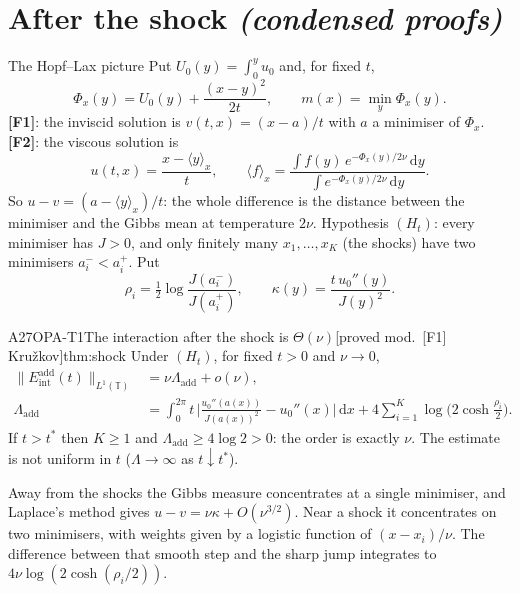 \documentclass[11pt,a4paper,oneside]{report}
\newcommand{\badge}[2]{\textcolor{#1}{\textsf{\footnotesize[#2]}}}
\newcommand{\modulo}[1]{\badge{cD}{proved mod.\ #1}}
\newcommand{\Eint}{E_{\mathrm{int}}}
\newcommand{\dd}{\,\mathrm{d}}
\newenvironment{dimcard}[5]{\par\Needspace{12\baselineskip}\begin{dimcardbox}{#1}{#2}{#3}{#4}{#5}}{\end{dimcardbox}}
\begin{document}
\section{After the shock \emph{(condensed proofs)}}

\begin{notebox}{The Hopf--Lax picture}
Put $U_0(y)=\int_0^yu_0$ and, for fixed $t$,
\[
\Phi_x(y)=U_0(y)+\frac{(x-y)^2}{2t},\qquad m(x)=\min_y\Phi_x(y).
\]
\textbf{[F1]}: the inviscid solution is $v(t,x)=(x-a)/t$ with $a$ a minimiser of $\Phi_x$. \textbf{[F2]}: the viscous solution is
\[
u(t,x)=\frac{x-\langle y\rangle_x}{t},\qquad \langle f\rangle_x=\frac{\int f(y)\,e^{-\Phi_x(y)/2\nu}\dd y}{\int e^{-\Phi_x(y)/2\nu}\dd y}.
\]
So $u-v=(a-\langle y\rangle_x)/t$: the whole difference is the distance between the minimiser and the Gibbs mean at temperature $2\nu$. Hypothesis $(H_t)$: every minimiser has $J>0$, and only finitely many $x_1,\dots,x_K$ (the shocks) have two minimisers $a_i^-<a_i^+$. Put
\[
\rho_i=\tfrac12\log\frac{J(a_i^-)}{J(a_i^+)},\qquad \kappa(y)=\frac{t\,u_0''(y)}{J(y)^2}.
\]
\end{notebox}

\begin{dimcard}{A27}{OPA-T1}{The interaction after the shock is $\Theta(\nu)$}{\modulo{[F1] Kru\v zkov}}{thm:shock}
Under $(H_t)$, for fixed $t>0$ and $\nu\to0$,
\begin{align*}
\|\Eint^{\mathrm{add}}(t)\|_{L^1(\mathbb T)}&=\nu\Lambda_{\mathrm{add}}+o(\nu),\\
\Lambda_{\mathrm{add}}&=\int_0^{2\pi}t\,\Big|\frac{u_0''(a(x))}{J(a(x))^2}-u_0''(x)\Big|\dd x+4\sum_{i=1}^K\log\Big(2\cosh\frac{\rho_i}{2}\Big).
\end{align*}
If $t>t^*$ then $K\ge1$ and $\Lambda_{\mathrm{add}}\ge4\log2>0$: the order is exactly $\nu$. The estimate is not uniform in $t$ ($\Lambda\to\infty$ as $t\downarrow t^*$).
\end{dimcard}

\begin{proofidea}
Away from the shocks the Gibbs measure concentrates at a single minimiser, and Laplace's method gives $u-v=\nu\kappa+O(\nu^{3/2})$. Near a shock it concentrates on two minimisers, with weights given by a logistic function of $(x-x_i)/\nu$. The difference between that smooth step and the sharp jump integrates to $4\nu\log(2\cosh(\rho_i/2))$.
\end{proofidea}
\end{document}
